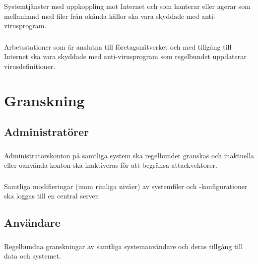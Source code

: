 \documentclass[a4paper,12pt]{article}
\begin{document}
Systemtjänster med uppkoppling mot Internet och som hanterar eller agerar som mellanhand med filer från okända källor ska vara skyddade med anti-virusprogram.

\subsubsection{} \label{datasakerhet_antivirus_arbetsstation}

Arbetsstationer som är anslutna till företagsnätverket och med tillgång till Internet ska vara skyddade med anti-virusprogram som regelbundet uppdaterar virusdefinitioner.

\section{Granskning}

\subsection{Administratörer}

\subsubsection{}

Administratörskonton på samtliga system ska regelbundet granskas och inaktuella eller oanvända konton ska inaktiveras för att begränsa attackvektorer.

\subsubsection{}

Samtliga modifieringar (inom rimliga nivåer) av systemfiler och -konfigurationer ska loggas till en central server.

\subsection{Användare}

\subsubsection{}

Regelbundna granskningar av samtliga systemanvändare och deras tillgång till data och systemet.

\subsubsection{}
\end{document}
